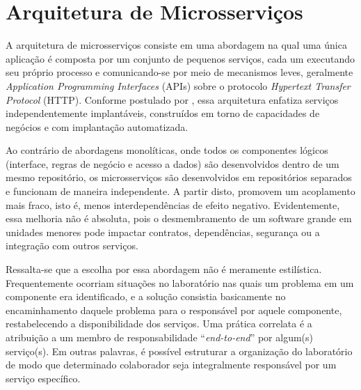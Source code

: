\section{Arquitetura de Microsserviços}

A arquitetura de microsserviços consiste em uma abordagem na qual uma única aplicação é composta por um conjunto de pequenos serviços, cada um executando seu próprio processo e comunicando-se por meio de mecanismos leves, geralmente \textit{Application Programming Interfaces} (APIs) sobre o protocolo \textit{Hypertext Transfer Protocol} (HTTP). Conforme postulado por , essa arquitetura enfatiza serviços independentemente implantáveis, construídos em torno de capacidades de negócios e com implantação automatizada.

Ao contrário de abordagens monolíticas, onde todos os componentes lógicos (interface, regras de negócio e acesso a dados) são desenvolvidos dentro de um mesmo repositório, os microsserviços são desenvolvidos em repositórios separados e funcionam de maneira independente. A partir disto, promovem um acoplamento mais fraco, isto é, menos interdependências de efeito negativo. Evidentemente, essa melhoria não é absoluta, pois o desmembramento de um software grande em unidades menores pode impactar contratos, dependências, segurança ou a integração com outros serviços. 

Ressalta-se que a escolha por essa abordagem não é meramente estilística. Frequentemente ocorriam situações no laboratório nas quais um problema em um componente era identificado, e a solução consistia basicamente no encaminhamento daquele problema para o responsável por aquele componente, restabelecendo a disponibilidade dos serviços. Uma prática correlata é a atribuição a um membro de responsabilidade ``\textit{end-to-end}'' por algum(s) serviço(s). Em outras palavras, é possível estruturar a organização do laboratório de modo que determinado colaborador seja integralmente responsável por um serviço específico.

